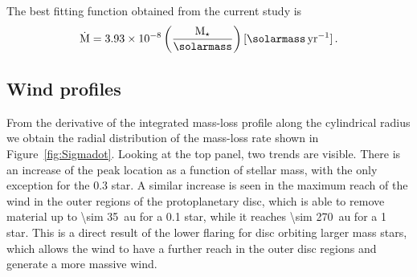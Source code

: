 \documentclass[usenatbib,useAMS,usedcolumn]{mnras}
\begin{document}
The best fitting function obtained from the current study is
\begin{equation}\label{eq:MdotLxMass}
  \dot{\mathrm{M}} = 3.93\times10^{-8} \left(\frac{\mathrm{M}_\star}{\si{\solarmass}}\right) [\si{\solarmass.yr^{-1}}]\,.
\end{equation}

\subsection{Wind profiles}\label{sec:wind-prof}
From the derivative of the integrated mass-loss profile along the cylindrical radius we obtain the radial distribution of the mass-loss rate shown in Figure~\ref{fig:Sigmadot}. Looking at the top panel, two trends are visible. There is an increase of the peak location as a function of stellar mass, with the only exception for the \SI{0.3}{\solarmass} star. A similar increase is seen in the maximum reach of the wind in the outer regions of the protoplanetary disc, which is able to remove material up to \SI{\sim 35}{\astronomicalunit} for a \SI{0.1}{\solarmass} star, while it reaches \SI{\sim 270}{\astronomicalunit} for a \SI{1}{\solarmass} star. This is a direct result of the lower flaring for disc orbiting larger mass stars, which allows the wind to have a further reach in the outer disc regions and generate a more massive wind.
\end{document}
